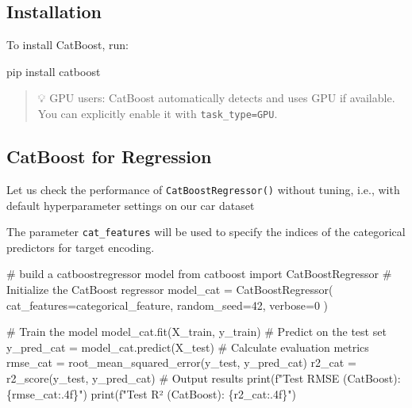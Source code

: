 \documentclass[
  letterpaper,
  DIV=11,
  numbers=noendperiod]{scrreprt}
\newenvironment{Shaded}{\begin{snugshade}}{\end{snugshade}}
\newcommand{\BuiltInTok}[1]{\textcolor[rgb]{0.00,0.23,0.31}{#1}}
\newcommand{\CommentTok}[1]{\textcolor[rgb]{0.37,0.37,0.37}{#1}}
\newcommand{\DecValTok}[1]{\textcolor[rgb]{0.68,0.00,0.00}{#1}}
\newcommand{\ImportTok}[1]{\textcolor[rgb]{0.00,0.46,0.62}{#1}}
\newcommand{\NormalTok}[1]{\textcolor[rgb]{0.00,0.23,0.31}{#1}}
\newcommand{\OperatorTok}[1]{\textcolor[rgb]{0.37,0.37,0.37}{#1}}
\newcommand{\SpecialCharTok}[1]{\textcolor[rgb]{0.37,0.37,0.37}{#1}}
\newcommand{\SpecialStringTok}[1]{\textcolor[rgb]{0.13,0.47,0.30}{#1}}
\begin{document}
\subsection{Installation}\label{installation}

To install CatBoost, run:

\begin{Shaded}
\begin{Highlighting}[]
\NormalTok{pip install catboost}
\end{Highlighting}
\end{Shaded}

\begin{quote}
💡 GPU users: CatBoost automatically detects and uses GPU if available.
You can explicitly enable it with
\texttt{task\_type=\textquotesingle{}GPU\textquotesingle{}}.
\end{quote}

\subsection{CatBoost for Regression}\label{catboost-for-regression}

Let us check the performance of \texttt{CatBoostRegressor()} without
tuning, i.e., with default hyperparameter settings on our car dataset

The parameter \texttt{cat\_features} will be used to specify the indices
of the categorical predictors for target encoding.

\begin{Shaded}
\begin{Highlighting}[]
\CommentTok{\# build a catboostregressor model}
\ImportTok{from}\NormalTok{ catboost }\ImportTok{import}\NormalTok{ CatBoostRegressor}
\CommentTok{\# Initialize the CatBoost regressor}
\NormalTok{model\_cat }\OperatorTok{=}\NormalTok{ CatBoostRegressor(}
\NormalTok{    cat\_features}\OperatorTok{=}\NormalTok{categorical\_feature,}
\NormalTok{    random\_seed}\OperatorTok{=}\DecValTok{42}\NormalTok{,}
\NormalTok{    verbose}\OperatorTok{=}\DecValTok{0}
\NormalTok{)}

\CommentTok{\# Train the model}
\NormalTok{model\_cat.fit(X\_train, y\_train)}
\CommentTok{\# Predict on the test set}
\NormalTok{y\_pred\_cat }\OperatorTok{=}\NormalTok{ model\_cat.predict(X\_test)}
\CommentTok{\# Calculate evaluation metrics}
\NormalTok{rmse\_cat }\OperatorTok{=}\NormalTok{ root\_mean\_squared\_error(y\_test, y\_pred\_cat)}
\NormalTok{r2\_cat }\OperatorTok{=}\NormalTok{ r2\_score(y\_test, y\_pred\_cat)}
\CommentTok{\# Output results}
\BuiltInTok{print}\NormalTok{(}\SpecialStringTok{f"Test RMSE (CatBoost): }\SpecialCharTok{\{}\NormalTok{rmse\_cat}\SpecialCharTok{:.4f\}}\SpecialStringTok{"}\NormalTok{)}
\BuiltInTok{print}\NormalTok{(}\SpecialStringTok{f"Test R² (CatBoost): }\SpecialCharTok{\{}\NormalTok{r2\_cat}\SpecialCharTok{:.4f\}}\SpecialStringTok{"}\NormalTok{)}
\end{Highlighting}
\end{Shaded}
\end{document}
